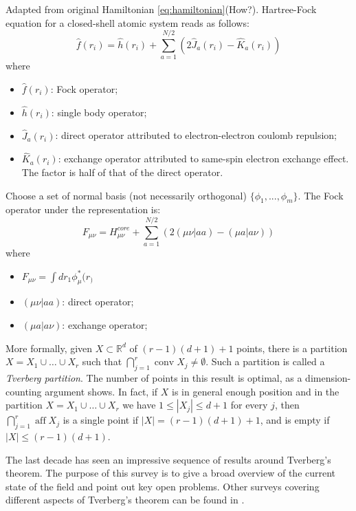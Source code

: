 \documentclass[11pt]{article}
\newcommand{\rr}{\mathbb{R}}
\DeclareMathOperator{\conv}{conv}
\DeclareMathOperator{\aff}{aff}
\begin{document}
Adapted from original Hamiltonian \ref{eq:hamiltonian}(How?). Hartree-Fock equation for a closed-shell atomic system reads as follows:
\cite{?}
\begin{equation}
\label{eq:hartree-fock}
\hat{f}(r_i) = \hat{h}(r_i)+\sum_{a=1}^{N/2}(2\hat{J}_a(r_i)-\hat{K}_a(r_i))
\end{equation}
where
\begin{itemize}
    \item $\hat{f}(r_i)$: Fock operator;
    \item $\hat{h}(r_i)$: single body operator;
    \item $\hat{J}_a(r_i)$: direct operator attributed to electron-electron coulomb repulsion;
    \item $\hat{K}_a(r_i)$: exchange operator attributed to same-spin electron exchange effect. The factor is half of that of the direct operator. 
\end{itemize}
Choose a set of normal basis (not necessarily orthogonal) $\{\phi_1, ... , \phi_m\}$. The Fock operator under the representation is:
\begin{equation}\label{eq:fock-representation}
    F_{\mu\nu}=H^{core}_{\mu\nu} + \sum_{a=1}^{N/2}(2(\mu\nu|aa)-(\mu a|a\nu))
\end{equation}
where 
\begin{itemize}
    \item $F_{\mu\nu} = \int{dr_1 \phi_{\mu}^*(r_)}$
    \item $(\mu\nu|aa)$: direct operator;
    \item $(\mu a|a\nu)$: exchange operator;
\end{itemize}

More formally, given $X\subset \rr^d$ of $(r-1)(d+1)+1$ points, there is a partition $X=X_1\cup \dots \cup X_r$ such that $\bigcap_{j=1}^r \conv X_j \ne \emptyset$. Such a partition is called a
 \textit{Tverberg partition}. The number of points in this result is optimal, as a dimension-counting argument shows. In fact, if $X$ is in general enough position and in the partition $X=X_1\cup \ldots \cup X_r$ we have $1\le |X_j|\le d+1$ for every $j$, then $\bigcap_{j=1}^r \aff X_j$ is a single point if $|X|= (r-1)(d+1)+1$, and is empty if $|X|\le (r-1)(d+1)$.


The last decade has seen an impressive sequence of results around Tverberg's theorem.  The purpose of this survey is to give a broad overview of  the current state of the field and point out key open problems.  Other surveys covering different aspects of Tverberg's theorem can be found in \cite{Eckhoff:1979bi, Eck93survey, Matousek:2002td, BBZ17survey, de2017discrete, BZ17}.
\end{document}
